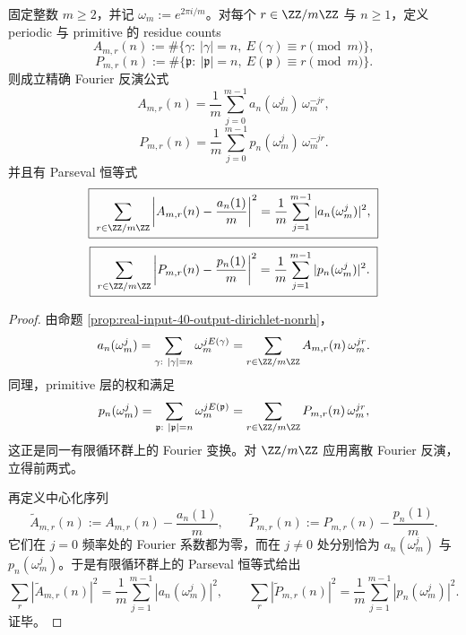 \begin{theorem}\label{thm:xi-dirichlet-residue-fourier-parseval-exact}
固定整数 \(m\ge 2\)，并记 \(\omega_m:=e^{2\pi i/m}\)。对每个 \(r\in\ZZ/m\ZZ\) 与 \(n\ge 1\)，定义 periodic 与 primitive 的 residue counts
\[
A_{m,r}(n):=\#\{\gamma:\ |\gamma|=n,\ E(\gamma)\equiv r\pmod m\},
\]
\[
P_{m,r}(n):=\#\{\mathfrak p:\ |\mathfrak p|=n,\ E(\mathfrak p)\equiv r\pmod m\}.
\]
则成立精确 Fourier 反演公式
\[
\boxed{\;
A_{m,r}(n)=\frac1m\sum_{j=0}^{m-1}a_n(\omega_m^j)\,\omega_m^{-jr},\;}
\]
\[
\boxed{\;
P_{m,r}(n)=\frac1m\sum_{j=0}^{m-1}p_n(\omega_m^j)\,\omega_m^{-jr}.\;}
\]
并且有 Parseval 恒等式
\[
\boxed{\;
\sum_{r\in\ZZ/m\ZZ}
\left|A_{m,r}(n)-\frac{a_n(1)}{m}\right|^2
=
\frac1m\sum_{j=1}^{m-1}|a_n(\omega_m^j)|^2,\;}
\]
\[
\boxed{\;
\sum_{r\in\ZZ/m\ZZ}
\left|P_{m,r}(n)-\frac{p_n(1)}{m}\right|^2
=
\frac1m\sum_{j=1}^{m-1}|p_n(\omega_m^j)|^2.\;}
\]
\end{theorem}
\begin{proof}
由命题 \ref{prop:real-input-40-output-dirichlet-nonrh}，
\[
a_n(\omega_m^j)
=
\sum_{\gamma:\ |\gamma|=n}\omega_m^{jE(\gamma)}
=
\sum_{r\in\ZZ/m\ZZ}A_{m,r}(n)\,\omega_m^{jr}.
\]
同理，primitive 层的权和满足
\[
p_n(\omega_m^j)
=
\sum_{\mathfrak p:\ |\mathfrak p|=n}\omega_m^{jE(\mathfrak p)}
=
\sum_{r\in\ZZ/m\ZZ}P_{m,r}(n)\,\omega_m^{jr},
\]
这正是同一有限循环群上的 Fourier 变换。对 \(\ZZ/m\ZZ\) 应用离散 Fourier 反演，立得前两式。

再定义中心化序列
\[
\widetilde A_{m,r}(n):=A_{m,r}(n)-\frac{a_n(1)}{m},
\qquad
\widetilde P_{m,r}(n):=P_{m,r}(n)-\frac{p_n(1)}{m}.
\]
它们在 \(j=0\) 频率处的 Fourier 系数都为零，而在 \(j\neq 0\) 处分别恰为 \(a_n(\omega_m^j)\) 与 \(p_n(\omega_m^j)\)。于是有限循环群上的 Parseval 恒等式给出
\[
\sum_r |\widetilde A_{m,r}(n)|^2
=
\frac1m\sum_{j=1}^{m-1}|a_n(\omega_m^j)|^2,
\qquad
\sum_r |\widetilde P_{m,r}(n)|^2
=
\frac1m\sum_{j=1}^{m-1}|p_n(\omega_m^j)|^2.
\]
证毕。
\end{proof}

